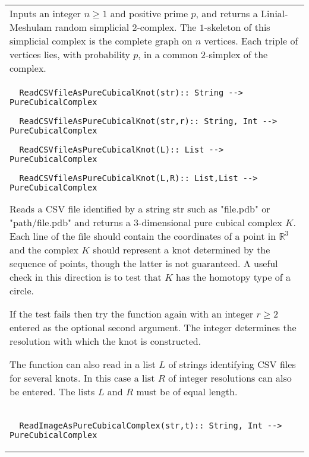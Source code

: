 \documentclass[a4paper,11pt]{report}
\begin{document}
{\begin{center}
\begin{tabular}{|l|}
 

 Inputs an integer $ n \ge 1 $ and positive prime $p$, and returns a Linial-Meshulam random simplicial $2$-complex. The $1$-skeleton of this simplicial complex is the complete graph on $n$ vertices. Each triple of vertices lies, with probability $p$, in a common $2$-simplex of the complex. \\
 \index{ReadCSVfileAsPureCubicalKnot} 
\begin{verbatim}  ReadCSVfileAsPureCubicalKnot(str):: String --> PureCubicalComplex
\end{verbatim}
 
\begin{verbatim}  ReadCSVfileAsPureCubicalKnot(str,r):: String, Int --> PureCubicalComplex
\end{verbatim}
 
\begin{verbatim}  ReadCSVfileAsPureCubicalKnot(L):: List --> PureCubicalComplex
\end{verbatim}
 
\begin{verbatim}  ReadCSVfileAsPureCubicalKnot(L,R):: List,List --> PureCubicalComplex
\end{verbatim}


 

 Reads a CSV file identified by a string str such as "file.pdb" or
"path/file.pdb" and returns a $3$-dimensional pure cubical complex $K$. Each line of the file should contain the coordinates of a point in $\mathbb R^3$ and the complex $K$ should represent a knot determined by the sequence of points, though the
latter is not guaranteed. A useful check in this direction is to test that $K$ has the homotopy type of a circle. 

If the test fails then try the function again with an integer $r \ge 2$ entered as the optional second argument. The integer determines the resolution
with which the knot is constructed. 

 The function can also read in a list $L$ of strings identifying CSV files for several knots. In this case a list $R$ of integer resolutions can also be entered. The lists $L$ and $R$ must be of equal length. \\
 \index{ReadImageAsPureCubicalComplex} 
\begin{verbatim}  ReadImageAsPureCubicalComplex(str,t):: String, Int --> PureCubicalComplex
\end{verbatim}


 


\end{tabular}
\end{center}}
\end{document}
